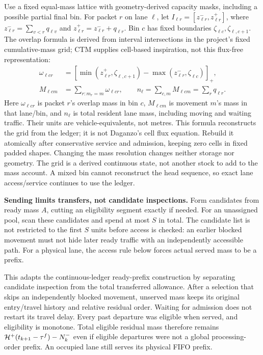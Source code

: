 \documentclass[10pt,a4paper]{article}
\begin{document}
Use a fixed equal-mass lattice with geometry-derived capacity masks,
including a possible partial final bin. For packet $r$ on lane $\ell$,
let $I_{\ell r}=[z^-_{\ell r},z^+_{\ell r}]$, where
$z^-_{\ell r}=\sum_{v<r}q_{\ell v}$ and
$z^+_{\ell r}=z^-_{\ell r}+q_{\ell r}$.
Bin $c$ has fixed boundaries $\zeta_{\ell c},\zeta_{\ell,c+1}$.
The overlap formula is derived from interval intersections in the project's fixed cumulative-mass grid; CTM supplies cell-based inspiration, not this flux-free representation:
\begin{equation}
 \begin{aligned}
 \omega_{\ell cr}&=
 [\min(z^+_{\ell r},\zeta_{\ell,c+1})
           -\max(z^-_{\ell r},\zeta_{\ell c})]_+,\\
 M_{\ell cm}&=\sum_{r:m_r=m}\omega_{\ell cr},\qquad
 n_\ell=\sum_{c,m}M_{\ell cm}=\sum_rq_{\ell r}.
 \end{aligned}
 \label{eq:grid}
\end{equation}
Here $\omega_{\ell cr}$ is packet $r$'s overlap mass in bin $c$,
$M_{\ell cm}$ is movement $m$'s mass in that lane/bin, and $n_\ell$
is total resident lane mass, including moving and waiting traffic.
Their units are vehicle-equivalents, not metres.
This formula reconstructs the grid from the ledger; it is not Daganzo's
cell flux equation. Rebuild it atomically after conservative service and
admission, keeping zero cells in fixed padded shapes. Changing the mass
resolution changes neither storage nor geometry. The grid is a derived
continuous state, not another stock to add to the mass account. A mixed
bin cannot reconstruct the head sequence, so exact lane access/service
continues to use the ledger.
\par

\textbf{Sending limits transfers, not candidate inspections.}
Form candidates from ready mass $A$, cutting an eligibility segment
exactly if needed. For an unassigned pool, scan these candidates and
spend at most $S$ in total. The candidate list is not restricted to the first $S$ units before access
is checked: an earlier blocked movement must not hide later ready traffic
with an independently accessible path. For a physical lane, the access rule below forces
actual served mass to be a prefix.

This adapts the continuous-ledger ready-prefix construction by separating
candidate inspection from the total transferred allowance. After a
selection that skips an independently blocked movement, unserved mass
keeps its original entry/travel history and relative residual order.
Waiting for admission does not restart its travel delay. Every past departure was eligible when served, and eligibility
is monotone. Total eligible residual mass therefore remains
${\cal H}^+(t_{k+1}-\tau^f)-N^-_k$ even if eligible departures were not
a global processing-order prefix. An occupied lane still serves its
physical FIFO prefix.
\end{document}
